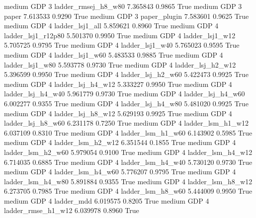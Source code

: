     medium      GDP                 3    ladder_rmsej_h8_w80   7.365843      0.9865    True
    medium      GDP                 3                  paper   7.613533      0.9290    True
    medium      GDP                 3           paper_plugin   7.583601      0.9625    True
    medium      GDP                 4        ladder_lsj1_all   5.859621      0.8960    True
    medium      GDP                 4     ladder_lsj1_r12p80   5.501370      0.9950    True
    medium      GDP                 4        ladder_lsj1_w12   5.705725      0.9795    True
    medium      GDP                 4        ladder_lsj1_w40   5.765023      0.9595    True
    medium      GDP                 4        ladder_lsj1_w60   5.483533      0.9885    True
    medium      GDP                 4        ladder_lsj1_w80   5.593778      0.9730    True
    medium      GDP                 4      ladder_lsj_h2_w12   5.396599      0.9950    True
    medium      GDP                 4      ladder_lsj_h2_w60   5.422473      0.9925    True
    medium      GDP                 4      ladder_lsj_h4_w12   5.333227      0.9950    True
    medium      GDP                 4      ladder_lsj_h4_w40   5.961779      0.9730    True
    medium      GDP                 4      ladder_lsj_h4_w60   6.002277      0.9355    True
    medium      GDP                 4      ladder_lsj_h4_w80   5.481020      0.9925    True
    medium      GDP                 4      ladder_lsj_h8_w12   5.629193      0.9925    True
    medium      GDP                 4      ladder_lsj_h8_w60   6.231178      0.7250    True
    medium      GDP                 4      ladder_lsm_h1_w12   6.037109      0.8310    True
    medium      GDP                 4      ladder_lsm_h1_w60   6.143902      0.5985    True
    medium      GDP                 4      ladder_lsm_h2_w12   6.351544      0.1855    True
    medium      GDP                 4      ladder_lsm_h2_w60   5.979054      0.9100    True
    medium      GDP                 4      ladder_lsm_h4_w12   6.714035      0.6885    True
    medium      GDP                 4      ladder_lsm_h4_w40   5.730120      0.9730    True
    medium      GDP                 4      ladder_lsm_h4_w60   5.776207      0.9795    True
    medium      GDP                 4      ladder_lsm_h4_w80   5.891884      0.9355    True
    medium      GDP                 4      ladder_lsm_h8_w12   6.273705      0.7985    True
    medium      GDP                 4      ladder_lsm_h8_w60   5.444009      0.9950    True
    medium      GDP                 4             ladder_mdd   6.019575      0.8205    True
    medium      GDP                 4     ladder_rmse_h1_w12   6.039978      0.8960    True
